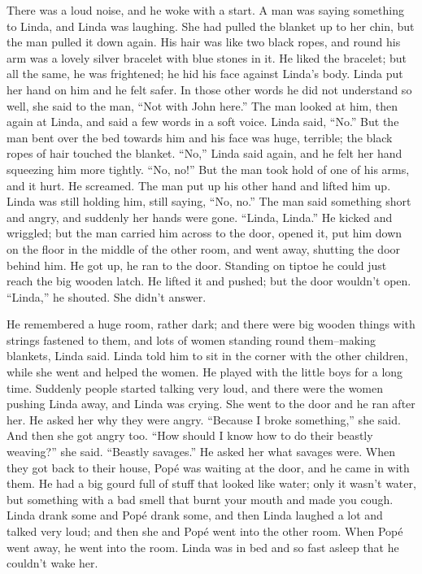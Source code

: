 \documentclass[12pt]{report}
\begin{document}
There was a loud noise, and he woke with a start. A man was saying
something to Linda, and Linda was laughing. She had pulled the blanket
up to her chin, but the man pulled it down again. His hair was like two
black ropes, and round his arm was a lovely silver bracelet with blue
stones in it. He liked the bracelet; but all the same, he was
frightened; he hid his face against Linda's body. Linda put her hand on
him and he felt safer. In those other words he did not understand so
well, she said to the man, ``Not with John here.'' The man looked at
him, then again at Linda, and said a few words in a soft voice. Linda
said, ``No.'' But the man bent over the bed towards him and his face was
huge, terrible; the black ropes of hair touched the blanket. ``No,''
Linda said again, and he felt her hand squeezing him more tightly. ``No,
no!'' But the man took hold of one of his arms, and it hurt. He
screamed. The man put up his other hand and lifted him up. Linda was
still holding him, still saying, ``No, no.'' The man said something
short and angry, and suddenly her hands were gone. ``Linda, Linda.'' He
kicked and wriggled; but the man carried him across to the door, opened
it, put him down on the floor in the middle of the other room, and went
away, shutting the door behind him. He got up, he ran to the door.
Standing on tiptoe he could just reach the big wooden latch. He lifted
it and pushed; but the door wouldn't open. ``Linda,'' he shouted. She
didn't answer.

He remembered a huge room, rather dark; and there were big wooden things
with strings fastened to them, and lots of women standing round
them--making blankets, Linda said. Linda told him to sit in the corner
with the other children, while she went and helped the women. He played
with the little boys for a long time. Suddenly people started talking
very loud, and there were the women pushing Linda away, and Linda was
crying. She went to the door and he ran after her. He asked her why they
were angry. ``Because I broke something,'' she said. And then she got
angry too. ``How should I know how to do their beastly weaving?'' she
said. ``Beastly savages.'' He asked her what savages were. When they got
back to their house, Popé was waiting at the door, and he came in with
them. He had a big gourd full of stuff that looked like water; only it
wasn't water, but something with a bad smell that burnt your mouth and
made you cough. Linda drank some and Popé drank some, and then Linda
laughed a lot and talked very loud; and then she and Popé went into the
other room. When Popé went away, he went into the room. Linda was in bed
and so fast asleep that he couldn't wake her.
\end{document}
